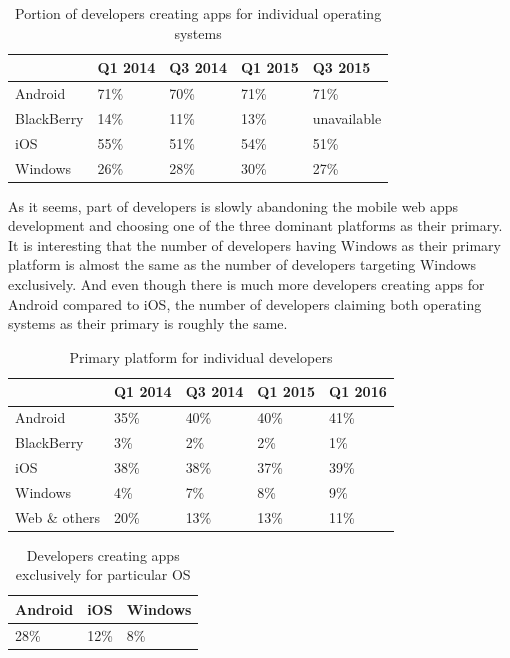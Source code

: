 \documentclass[english,master,public,dept460,male,cpdeclaration,oneside]{diploma}
\begin{document}
\begin{table}
	\centering
	\caption{Portion of developers creating apps for individual operating systems}
	\begin{tabular}{l l l l l}
		\toprule
		 & Q1 2014 & Q3 2014 & Q1 2015 & Q3 2015 \\
		\midrule
		Android & 71\% & 70\% & 71\% & 71\% \\
		BlackBerry & 14\% & 11\% & 13\% & unavailable \\
		iOS & 55\% & 51\% & 54\% & 51\% \\
		Windows & 26\% & 28\% & 30\% & 27\% \\
		\midrule
	\end{tabular}
\end{table}

As it seems, part of developers is slowly abandoning the mobile web apps development and choosing one of the three dominant platforms as their primary. It is interesting that the number of developers having Windows as their primary platform is almost the same as the number of developers targeting Windows exclusively. And even though there is much more developers creating apps for Android compared to iOS, the number of developers claiming both operating systems as their primary is roughly the same.

\begin{table}
	\centering
	\caption{Primary platform for individual developers}
	\begin{tabular}{l l l l l}		
		\toprule
		 & Q1 2014 & Q3 2014 & Q1 2015 & Q1 2016 \\
		\midrule
		Android & 35\% & 40\% & 40\% & 41\% \\
		BlackBerry & 3\% & 2\% & 2\% & 1\% \\
		iOS & 38\% & 38\% & 37\% & 39\% \\
		Windows & 4\% & 7\% & 8\% & 9\% \\
		Web \& others & 20\% & 13\% & 13\% & 11\% \\
		\midrule
	\end{tabular}
\end{table}

\begin{table}
	\centering
	\caption{Developers creating apps exclusively for particular OS}
	\begin{tabular}{l l l}
		\toprule
		Android & iOS & Windows \\
		\midrule
		28\% & 12\% & 8\% \\
		\midrule
	\end{tabular}
\end{table}
\end{document}
